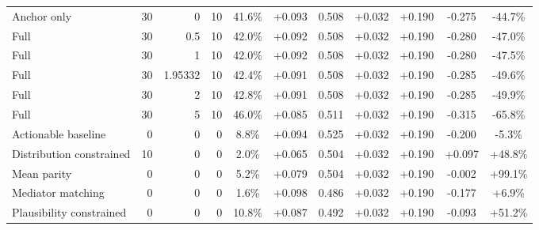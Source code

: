 \begin{table}[htbp]
\begin{tabular}{lrrrccccccc}
Anchor only & 30 & 0 & 10 & 41.6\% & +0.093 & 0.508 & +0.032 & +0.190 & -0.275 & -44.7\% \\
Full & 30 & 0.5 & 10 & 42.0\% & +0.092 & 0.508 & +0.032 & +0.190 & -0.280 & -47.0\% \\
Full & 30 & 1 & 10 & 42.0\% & +0.092 & 0.508 & +0.032 & +0.190 & -0.280 & -47.5\% \\
Full & 30 & 1.95332 & 10 & 42.4\% & +0.091 & 0.508 & +0.032 & +0.190 & -0.285 & -49.6\% \\
Full & 30 & 2 & 10 & 42.8\% & +0.091 & 0.508 & +0.032 & +0.190 & -0.285 & -49.9\% \\
Full & 30 & 5 & 10 & 46.0\% & +0.085 & 0.511 & +0.032 & +0.190 & -0.315 & -65.8\% \\
Actionable baseline & 0 & 0 & 0 & 8.8\% & +0.094 & 0.525 & +0.032 & +0.190 & -0.200 & -5.3\% \\
Distribution constrained & 10 & 0 & 0 & 2.0\% & +0.065 & 0.504 & +0.032 & +0.190 & +0.097 & +48.8\% \\
Mean parity & 0 & 0 & 0 & 5.2\% & +0.079 & 0.504 & +0.032 & +0.190 & -0.002 & +99.1\% \\
Mediator matching & 0 & 0 & 0 & 1.6\% & +0.098 & 0.486 & +0.032 & +0.190 & -0.177 & +6.9\% \\
Plausibility constrained & 0 & 0 & 0 & 10.8\% & +0.087 & 0.492 & +0.032 & +0.190 & -0.093 & +51.2\% \\
\bottomrule
\end{tabular}
\end{table}